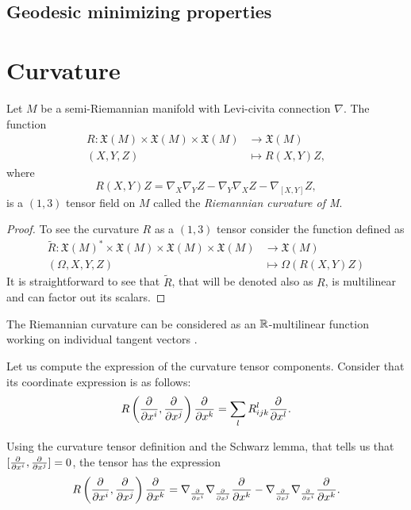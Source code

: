 \subsection{Geodesic minimizing properties}

\section{Curvature}

\begin{lemma}
	Let $M$ be a semi-Riemannian manifold with Levi-civita connection $\nabla$. The function
	\begin{align*}
		R \colon \mathfrak{X}(M) \times \mathfrak{X}(M) \times \mathfrak{X}(M) &\to \mathfrak{X}(M) \\
		(X, Y, Z) &\mapsto R(X,Y)Z,
	\end{align*}
	where
	\[
		R(X,Y)Z = \nabla_X \nabla_Y Z - \nabla_Y \nabla_X Z - \nabla_{[X,Y]} Z,
	\]
	is a $(1,3)$ tensor field on $M$ called the \emph{Riemannian curvature of M}.
\end{lemma}

\begin{proof}
	To see the curvature $R$ as a $(1,3)$ tensor consider the function defined as
		\begin{align*}
		\tilde{R} \colon \mathfrak{X}(M)^* \times \mathfrak{X}(M) \times \mathfrak{X}(M) \times \mathfrak{X}(M) &\to \mathfrak{X}(M) \\
		(\Omega, X, Y, Z) &\mapsto \Omega\left(R(X,Y)Z\right)
	\end{align*}
	It is straightforward to see that $\tilde{R}$, that will be denoted also as $R$, is multilinear and can factor out its scalars.
\end{proof}

The Riemannian curvature can be considered as an $\mathbb{R}$-multilinear function working on individual tangent vectors .








Let us compute the expression of the curvature tensor components. Consider that its coordinate expression is as follows:
\begin{equation}
	\label{eq:curvaturecomponents}
	R\left( \frac{\partial^{} }{\partial x^i}, \frac{\partial^{} }{\partial x^j} \right)\frac{\partial^{} }{\partial x^k} = \sum_l R^l_{ijk} \frac{\partial^{} }{\partial x^l}.
\end{equation}

Using the curvature tensor definition and the Schwarz lemma, that tells us that $[\frac{\partial^{} }{\partial x^i}, \frac{\partial^{} }{\partial x^j}] = 0$, the tensor has the expression
\[
	R\left( \frac{\partial^{} }{\partial x^i}, \frac{\partial^{} }{\partial x^j} \right)\frac{\partial^{} }{\partial x^k} = \nabla_{\frac{\partial^{} }{\partial x^i}} \nabla_{\frac{\partial^{} }{\partial x^j}} \frac{\partial^{} }{\partial x^k} - \nabla_{\frac{\partial^{} }{\partial x^j}} \nabla_{\frac{\partial^{} }{\partial x^i}} \frac{\partial^{} }{\partial x^k}.
\]

